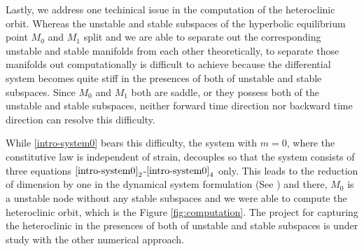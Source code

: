 \documentclass[a4paper,11pt]{article}
\theoremstyle{remark}
\begin{document}
Lastly, we address one techinical issue in the computation of the heteroclinic orbit. Whereas the unstable and stable subspaces of the hyperbolic equilibrium point $M_0$ and $M_1$ split and we are able to separate out the corresponding unstable and stable manifolds from each other theoretically, to separate those manifolds out computationally is difficult to achieve because the differential system becomes quite stiff in the presences of both of unstable and stable subspaces. Since $M_0$ and $M_1$ both are saddle, or they possess both of the unstable and stable subspaces, neither forward time direction nor backward time direction can resolve this difficulty.

While \eqref{intro-system0} bears this difficulty, the system with $m=0$, where the constitutive law is independent of strain, decouples so that the system consists of three equations $\eqref{intro-system0}_2$-$\eqref{intro-system0}_4$ only. This leads to the reduction of dimension by one in the dynamical system formulation (See \cite{KLT_HYP2016}) and there, $M_0$ is a unstable node without any stable subspaces and we were able to compute the heteroclinic orbit, which is the Figure \ref{fig:computation}. The project for capturing the heteroclinic in the presences of both of unstable and stable subspaces is under study with  the other numerical approach. 
\end{document}
